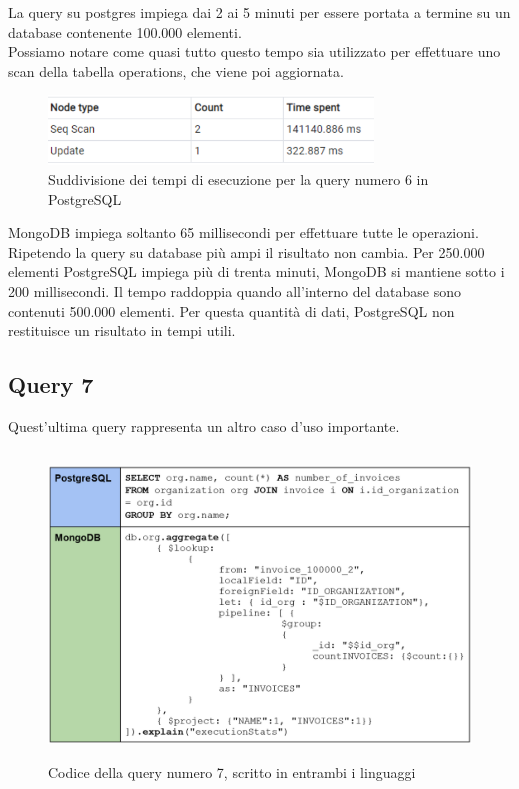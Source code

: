 \noindent La query su postgres impiega dai 2 ai 5 minuti per essere portata a termine su un database contenente 100.000 elementi.\\
Possiamo notare come quasi tutto questo tempo sia utilizzato per effettuare uno scan della tabella operations, che viene poi aggiornata.\\

\begin{figure}[htbp]
\begin{center}
\includegraphics[height=5em]{immagini/query/query6_results.png}
\caption{Suddivisione dei tempi di esecuzione per la query numero 6 in PostgreSQL}
\end{center}
\end{figure}

\noindent MongoDB impiega soltanto 65 millisecondi per effettuare tutte le operazioni.\\
Ripetendo la query su database più ampi il risultato non cambia. Per 250.000 elementi PostgreSQL impiega più di trenta minuti, MongoDB si mantiene sotto i 200 millisecondi. Il tempo raddoppia quando all'interno del database sono contenuti 500.000 elementi. Per questa quantità di dati, PostgreSQL non restituisce un risultato in tempi utili.\\


\subsection{Query 7}
Quest'ultima query rappresenta un altro caso d'uso importante.

\begin{figure}[htbp]
\begin{center}
\includegraphics[height=22em]{immagini/query/query7.png}
\caption{Codice della query numero 7, scritto in entrambi i linguaggi}
\end{center}
\end{figure}

